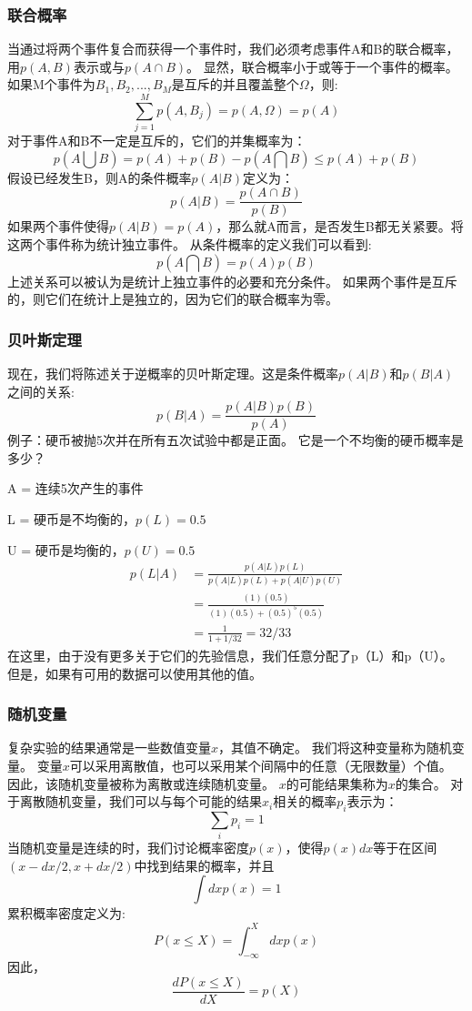 \documentclass[12pt, UTF8]{ctexart}%
\numberwithin{equation}{section}
\numberwithin{figure}{section}
\newcommand{\InsertEqution}[2]{\begin{equation}
  \label{#1}
   #2
 \end{equation}}
\newcommand{\InsertInlineEq}[1]{$#1$}
\begin{document}
\begin{sloppypar}
\subsubsection{联合概率}
当通过将两个事件复合而获得一个事件时，我们必须考虑事件A和B的联合概率，用\InsertInlineEq{p(A,B)}表示或与\InsertInlineEq{p(A \cap B)}。 显然，联合概率小于或等于一个事件的概率。 如果M个事件为\InsertInlineEq{B_1,B_2,...,B_M}是互斥的并且覆盖整个\InsertInlineEq{\Omega}，则:
\InsertEqution{7.3}{\sum_{j=1}^{M} p\left(A, B_{j}\right)=p(A, \Omega)=p(A)}
对于事件A和B不一定是互斥的，它们的并集概率为：
\InsertEqution{7.4}{p(A \bigcup B)=p(A)+p(B)-p(A \bigcap B) \leq p(A)+p(B)}
假设已经发生B，则A的条件概率\InsertInlineEq{p(A|B)}定义为：
\InsertEqution{7.5}{p(A | B)=\frac{p(A \cap B)}{p(B)}}
如果两个事件使得\InsertInlineEq{p(A|B)=p(A)}，那么就A而言，是否发生B都无关紧要。将这两个事件称为统计独立事件。 从条件概率的定义我们可以看到:
\InsertEqution{7.6}{p(A \bigcap B)=p(A) p(B)}
上述关系可以被认为是统计上独立事件的必要和充分条件。 如果两个事件是互斥的，则它们在统计上是独立的，因为它们的联合概率为零。
\subsubsection{贝叶斯定理}
现在，我们将陈述关于逆概率的贝叶斯定理。这是条件概率\InsertInlineEq{p(A|B)}和\InsertInlineEq{p(B|A)}之间的关系:
\InsertEqution{7.7}{p(B | A)=\frac{p(A | B) p(B)}{p(A)}}
例子：硬币被抛5次并在所有五次试验中都是正面。 它是一个不均衡的硬币概率是多少？

A = 连续5次产生的事件

L = 硬币是不均衡的，\InsertInlineEq{p(L)=0.5}

U = 硬币是均衡的，\InsertInlineEq{p(U)=0.5}
\InsertEqution{7.8}{\begin{aligned}
  p(L | A) &=\frac{p(A | L) p(L)}{p(A | L) p(L)+p(A | U) p(U)} \\
  &=\frac{(1)(0.5)}{(1)(0.5)+(0.5)^{5}(0.5)} \\
  &=\frac{1}{1+1 / 32}=32 / 33
  \end{aligned}}
在这里，由于没有更多关于它们的先验信息，我们任意分配了p（L）和p（U）。 但是，如果有可用的数据可以使用其他的值。
\subsubsection{随机变量}
复杂实验的结果通常是一些数值变量\InsertInlineEq{x}，其值不确定。 我们将这种变量称为随机变量。 变量\InsertInlineEq{x}可以采用离散值，也可以采用某个间隔中的任意（无限数量）个值。 因此，该随机变量被称为离散或连续随机变量。  \InsertInlineEq{x}的可能结果集称为\InsertInlineEq{x}的集合。 对于离散随机变量，我们可以与每个可能的结果\InsertInlineEq{x_i}相关的概率\InsertInlineEq{p_i}表示为：
\InsertEqution{7.9}{\sum_{i} p_{i}=1}
当随机变量是连续的时，我们讨论概率密度\InsertInlineEq{p(x)}，使得\InsertInlineEq{p(x)dx}等于在区间\InsertInlineEq{(x-dx/2,x+dx/2)}中找到结果的概率，并且
\InsertEqution{7.10}{\int d x p(x)=1}
累积概率密度定义为:
\InsertEqution{7.11}{P(x \leq X)=\int_{-\infty}^{X} d x p(x)}
因此，
\InsertEqution{7.12}{\frac{d P(x \leq X)}{d X}=p(X)}

\end{sloppypar}
\end{document}
